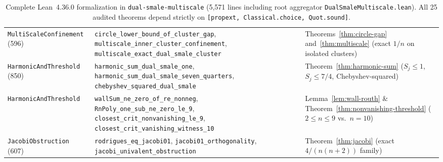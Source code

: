 \documentclass[11pt,a4paper]{article}
\theoremstyle{definition}
\theoremstyle{remark}
\begin{document}
\begin{table}[h]
\begin{tabular}{@{} >{\raggedright\arraybackslash}p{3.1cm} >{\raggedright\arraybackslash}p{6.3cm} >{\raggedright\arraybackslash}p{5.0cm} @{}}
\texttt{MultiScaleConfinement} (596) & \texttt{circle\_lower\_bound\_of\_cluster\_gap}, \texttt{multiscale\_inner\_cluster\_confinement}, \texttt{multiscale\_exact\_dual\_smale\_cluster} & Theorems~\ref{thm:circle-gap} and~\ref{thm:multiscale} (exact $1/n$ on isolated clusters) \\
\texttt{HarmonicAndThreshold} (850) & \texttt{harmonic\_sum\_dual\_smale\_one}, \texttt{harmonic\_sum\_dual\_smale\_seven\_quarters}, \texttt{chebyshev\_squared\_dual\_smale} & Theorem~\ref{thm:harmonic-sum} ($S_j \le 1$, $S_j \le 7/4$, Chebyshev-squared) \\
\texttt{HarmonicAndThreshold} & \texttt{wallSum\_ne\_zero\_of\_re\_nonneg}, \texttt{RnPoly\_one\_sub\_ne\_zero\_le\_9}, \texttt{closest\_crit\_nonvanishing\_le\_9}, \texttt{closest\_crit\_vanishing\_witness\_10} & Lemma~\ref{lem:wall-routh} \& Theorem~\ref{thm:nonvanishing-threshold} ($2 \le n \le 9$ vs.\ $n = 10$) \\
\texttt{JacobiObstruction} (607) & \texttt{rodrigues\_eq\_jacobi01}, \texttt{jacobi01\_orthogonality}, \texttt{jacobi\_univalent\_obstruction} & Theorem~\ref{thm:jacobi} (exact $4/(n(n+2))$ family) \\
\bottomrule
\end{tabular}
\caption{Complete Lean~4.36.0 formalization in \texttt{dual-smale-multiscale} (5,571 lines including root aggregator \texttt{DualSmaleMultiscale.lean}). All 25 audited theorems depend strictly on \texttt{[propext, Classical.choice, Quot.sound]}.}
\label{tab:lean}
\end{table}
\end{document}
